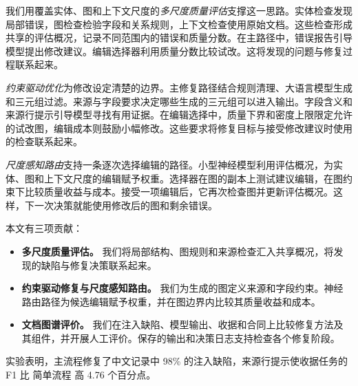我们用覆盖实体、图和上下文尺度的\emph{多尺度质量评估}支撑这一思路。实体检查发现局部错误，图检查检验字段和关系规则，上下文检查使用原始文档。这些检查形成共享的评估概况，记录不同范围内的错误和质量分数。在主路径中，错误报告引导模型提出修改建议。编辑选择器利用质量分数比较试改。这将发现的问题与修复过程联系起来。

\emph{约束驱动优化}为修改设定清楚的边界。主修复路径结合规则清理、大语言模型生成和三元组过滤。来源与字段要求决定哪些生成的三元组可以进入输出。字段含义和来源行提示引导模型寻找有用证据。在编辑选择中，质量下界和密度上限限定允许的试改图，编辑成本则鼓励小幅修改。这些要求将修复目标与接受修改建议时使用的检查联系起来。

\emph{尺度感知路由}支持一条逐次选择编辑的路径。小型神经模型利用评估概况，为实体、图和上下文尺度的编辑赋予权重。选择器在图的副本上测试建议编辑，在图约束下比较质量收益与成本。接受一项编辑后，它再次检查图并更新评估概况。这样，下一次决策就能使用修改后的图和剩余错误。

本文有三项贡献：
\begin{itemize}
    \item \textbf{多尺度质量评估。}
    我们将局部结构、图规则和来源检查汇入共享概况，将发现的缺陷与修复决策联系起来。
    \item \textbf{约束驱动修复与尺度感知路由。}
    我们为生成的图定义来源和字段约束。神经路由路径为候选编辑赋予权重，并在图边界内比较其质量收益和成本。
    \item \textbf{文档图谱评价。}
    我们在注入缺陷、模型输出、收据和合同上比较修复方法及其组件，并开展人工评价。保存的输出和决策日志支持检查各个修复阶段。
\end{itemize}

实验表明，主流程修复了中文记录中 98\% 的注入缺陷，来源行提示使收据任务的 F1 比 简单流程 高 4.76 个百分点。